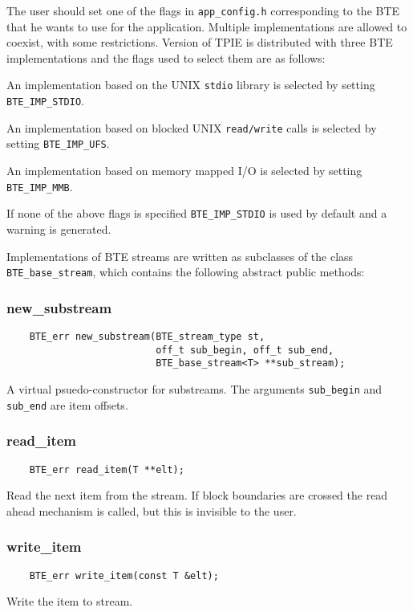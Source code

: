 The user should set one of the flags in \verb|app_config.h| corresponding
to the BTE that he wants to use for the application.  Multiple
implementations are allowed to coexist, with some restrictions. Version
\version of TPIE is distributed with three BTE implementations and the
flags used to select them are as follows:

An implementation based on the UNIX {\tt stdio} library  is selected by setting {\tt
  BTE\_IMP\_STDIO}.  
 
An implementation based on blocked UNIX {\tt read/write} calls  is selected by setting {\tt BTE\_IMP\_UFS}.

An implementation based on memory mapped I/O is
selected by setting {\tt BTE\_IMP\_MMB}.  

If none of the above flags is specified {\tt BTE\_IMP\_STDIO} is used by
default and a warning is generated.

Implementations of BTE streams are written as subclasses of the class
\verb|BTE_base_stream|, which contains the following abstract public methods:


\subsubsection{new\_substream}
\begin{verbatim}
    BTE_err new_substream(BTE_stream_type st,
                          off_t sub_begin, off_t sub_end,
                          BTE_base_stream<T> **sub_stream);
\end{verbatim}
A virtual psuedo-constructor for substreams. The arguments \verb|sub_begin| and
\verb|sub_end| are item offsets.


\subsubsection{read\_item}
\begin{verbatim}
    BTE_err read_item(T **elt);
\end{verbatim}
Read the next item from the stream. If block boundaries are crossed the
read ahead mechanism is called, but this is invisible to the user.

\subsubsection{write\_item}
\begin{verbatim}
    BTE_err write_item(const T &elt);
\end{verbatim}
Write the item to stream.


